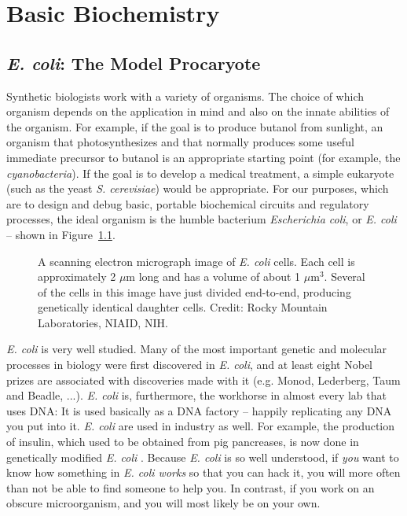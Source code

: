 \chapter{Basic Biochemistry} \label{ch:bio}

\section{{\em E. coli}: The Model Procaryote}

Synthetic biologists work with a variety of organisms. The choice of
which organism depends on the application in mind and also on the
innate abilities of the organism. For example, if the goal is to
produce butanol from sunlight, an organism that photosynthesizes and
that normally produces some useful immediate precursor to butanol is
an appropriate starting point (for example, the {\em
  cyanobacteria}). If the goal is to develop a medical treatment, a
simple eukaryote (such as the yeast {\em S. cerevisiae}) would be
appropriate. For our purposes, which are to design and debug basic,
portable biochemical circuits and regulatory processes, the ideal
organism is the humble bacterium {\em Escherichia coli}, or {\em
  E. coli} -- shown in Figure~\ref{fig:ecoli}. 

\begin{figure}
\caption{\label{fig:ecoli} A scanning electron micrograph image of
  {\em E. coli} cells. Each cell is approximately 2 $\mu$m long and
  has a volume of about 1 $\mu\mathrm{m}^3$. Several of the cells in
  this image have just divided end-to-end, producing genetically
  identical daughter cells. Credit: Rocky Mountain Laboratories,
  NIAID, NIH. }
\end{figure}

{\em E. coli} is very well studied. Many of the most important genetic
and molecular processes in biology were first discovered in {\em
  E. coli}, and at least eight Nobel prizes are associated with
discoveries made with it (e.g. Monod, Lederberg, Taum and Beadle,
...). {\em E. coli} is, furthermore, the workhorse in almost every lab
that uses DNA: It is used basically as a DNA factory -- happily
replicating any DNA you put into it. {\em E. coli} are used in
industry as well. For example, the production of insulin, which used
to be obtained from pig pancreases, is now done in genetically
modified {\em E. coli} \cite{insulin}. Because {\em E. coli} is so
well understood, if {\em you} want to know how something in {\em
  E. coli works} so that you can hack it, you will more often than not
be able to find someone to help you. In contrast, if you work on an
obscure microorganism, and you will most likely be on your own.

